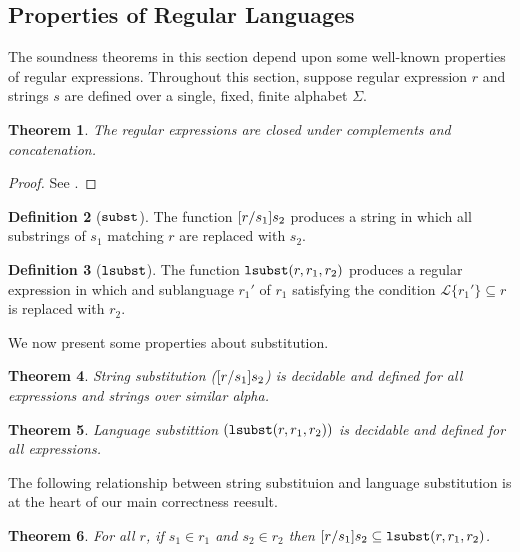 \documentclass[10pt,preprint]{sigplanconf}
\newtheorem{thm}{Theorem}
\theoremstyle{definition}
\newtheorem{defn}[thm]{Definition}
\newcommand{\Lagr}{\mathcal{L}}
\newcommand{\lang}[1]{\Lagr\{#1\}}
\newcommand{\lsubst}[3]{{\tt lsubst}(#1,#2,#3)}
\begin{document}
\subsection{Properties of Regular Languages}

The soundness theorems in this section depend upon some well-known properties
of regular expressions. Throughout this section, suppose regular expression
$r$ and strings $s$ are defined over a single, fixed, finite alphabet $\Sigma$.

\begin{thm} \label{thm:closure}
The regular expressions are closed under complements and concatenation.
\end{thm}
\begin{proof}
See \cite{cinderella}.
\end{proof}


\begin{defn}[$\tt{subst}$]
  The function $[r/s_1]s_2$ produces a string in which all substrings
  of $s_1$ matching $r$ are replaced with $s_2$.
\end{defn}

\begin{defn}[$\tt{lsubst}$]
  The function $\lsubst{r}{r_1}{r_2}$ produces a regular expression in which
  and sublanguage $r_1'$ of $r_1$ satisfying the condition $\lang{r_1'} \subseteq{r}$
  is replaced with $r_2$.
\end{defn}

We now present some properties about substitution.

\begin{thm}
  String substitution ($[r/s_1]s_2$) is decidable and defined for all expressions
  and strings over similar alpha.
\end{thm}

\begin{thm}
  Language substittion $(\lsubst{r}{r_1}{r_2})$ is decidable and defined for
  all expressions.
\end{thm}

The following relationship between string substituion and language substitution is at
the heart of our main correctness reesult.

\begin{thm}
  For all $r$, if $s_1 \in r_1$ and $s_2 \in r_2$ then 
  $\subst{r}{s_1}{s_2} \subseteq \lsubst{r}{r_1}{r_2}$.
\end{thm}
\end{document}
